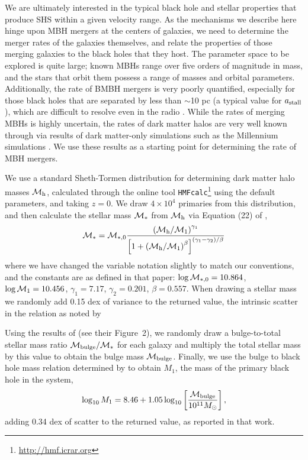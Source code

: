 \documentclass[a4paper,twocolumn]{emulateapj}
\begin{document}
{We are ultimately interested in the typical black hole and stellar properties that produce SHS within a given velocity range. As the mechanisms we describe here hinge upon MBH mergers at the centers of galaxies, we need to determine the merger rates of the galaxies themselves, and relate the properties of those merging galaxies to the black holes that they host. The parameter space to be explored is quite large; known MBHs range over five orders of magnitude in mass, and the stars that orbit them possess a range of masses and orbital parameters. Additionally, the rate of BMBH mergers is very poorly quantified, especially for those black holes that are separated by less than $\sim$10 pc (a typical value for $a_{\rm stall}$), which are difficult to resolve even in the radio \citep{Burke-Spolaor:2011b}. While the rates of merging MBHs is highly uncertain, the rates of dark matter halos are very well known through via results of dark matter-only simulations such as the Millennium simulations \citep{Boylan-Kolchin:2009a,Genel:2010a,Fakhouri:2010a}. We use these results as a starting point for determining the rate of MBH mergers.

We use a standard Sheth-Tormen distribution for determining dark matter halo masses ${\cal M}_{\rm h}$, calculated through the online tool {\tt HMFcalc}\footnote{\url{http://hmf.icrar.org}} \citep{Murray:2013a} using the default parameters, and taking $z = 0$. We draw $4 \times 10^{4}$ primaries from this distribution, and then calculate the stellar mass ${\cal M}_{\ast}$ from ${\cal M}_{\rm h}$ via Equation (22) of \citet{Moster:2010a},
\begin{equation}
{\cal M}_{\ast} = {\cal M}_{\ast,0} \frac{\left({\cal M}_{\rm h}/{\cal M}_{1}\right)^{\gamma_{1}}}{\left[1+\left({\cal M}_{\rm h}/{\cal M}_{1}\right)^{\beta}\right]^{\left(\gamma_{1}-\gamma_{2}\right)/\beta}}
\end{equation}
where we have changed the variable notation slightly to match our conventions, and the constants are as defined in that paper: $\log {\cal M}_{\ast,0} = 10.864$, $\log {\cal M}_{1} = 10.456$, $\gamma_{1} = 7.17$, $\gamma_{2} = 0.201$, $\beta = 0.557$. When drawing a stellar mass we randomly add 0.15 dex of variance to the returned value, the intrinsic scatter in the relation as noted by \citeauthor{Moster:2010a}

Using the results of \citet{Bluck:2014a} (see their Figure~2), we randomly draw a bulge-to-total stellar mass ratio ${\cal M}_{\rm bulge}/{\cal M}_{\ast}$ for each galaxy and multiply the total stellar mass by this value to obtain the bulge mass ${\cal M}_{\rm bulge}$. Finally, we use the bulge to black hole mass relation determined by \citet{McConnell:2013a} to obtain $M_{1}$, the mass of the primary black hole in the system,
\begin{equation}
\log_{10} M_{1} = 8.46 + 1.05 \log_{10} \left[\frac{{\cal M}_{\rm bulge}}{10^{11} M_{\odot}}\right],
\end{equation}
adding 0.34 dex of scatter to the returned value, as reported in that work.

}
\end{document}
